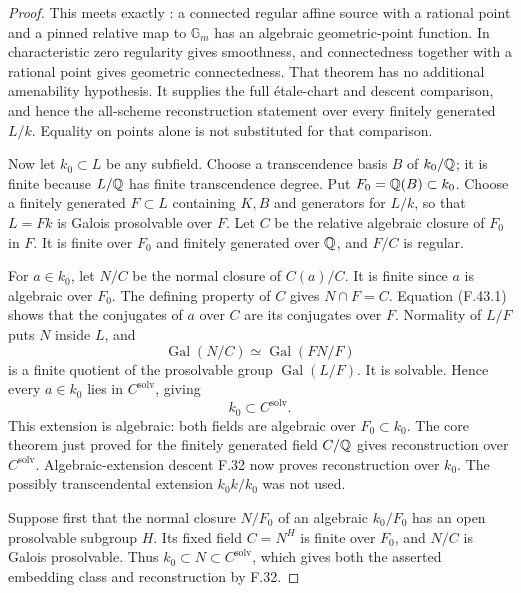 \begin{proof}
This meets exactly
\citet[Theorem~4.18(5)]{F_CHW2024}:
a connected regular affine source
with a rational point and a pinned
relative map to $\mathbb G_m$ has
an algebraic geometric-point function.
In characteristic zero regularity
gives smoothness, and connectedness
together with a rational point gives
geometric connectedness. That theorem
has no additional amenability
hypothesis. It supplies the full
étale-chart and descent comparison,
and hence the all-scheme reconstruction
statement over every finitely generated
$L/k$. Equality on points alone is
not substituted for that comparison.

Now let $k_0\subset L$ be any subfield.
Choose a transcendence basis $B$ of
$k_0/\mathbb Q$; it is finite because
$L/\mathbb Q$ has finite transcendence degree.
Put $F_0=\mathbb Q(B)\subset k_0$.
Choose a finitely generated $F\subset L$
containing $K,B$ and generators for
$L/k$, so that $L=Fk$ is Galois
prosolvable over $F$. Let $C$ be the
relative algebraic closure of $F_0$
in $F$. It is finite over $F_0$ and
finitely generated over $\mathbb Q$, and
$F/C$ is regular.

For $a\in k_0$, let $N/C$ be the
normal closure of $C(a)/C$. It is
finite since $a$ is algebraic over
$F_0$. The defining property of $C$
gives $N\cap F=C$. Equation (F.43.1)
shows that the conjugates of $a$
over $C$ are its conjugates over
$F$. Normality of $L/F$ puts
$N$ inside $L$, and
\[
 \operatorname{Gal}(N/C)
       \simeq\operatorname{Gal}(FN/F)
\]
is a finite quotient of the prosolvable
group $\operatorname{Gal}(L/F)$.
It is solvable. Hence every $a\in k_0$
lies in $C^{\mathrm{solv}}$, giving
\[
                    k_0\subset C^{\mathrm{solv}}.           \tag{F.43.12}
\]
This extension is algebraic: both
fields are algebraic over
$F_0\subset k_0$.
The core theorem just proved for
the finitely generated field $C/\mathbb Q$
gives reconstruction over
$C^{\mathrm{solv}}$.
Algebraic-extension descent F.32
now proves reconstruction over
$k_0$. The possibly transcendental
extension $k_0k/k_0$ was not used.

Suppose first that the normal closure
$N/F_0$ of an algebraic
$k_0/F_0$ has an open prosolvable
subgroup $H$. Its fixed field
$C=N^H$ is finite over $F_0$,
and $N/C$ is Galois prosolvable.
Thus $k_0\subset N\subset
C^{\mathrm{solv}}$, which gives
both the asserted embedding class
and reconstruction by F.32.


\end{proof}
